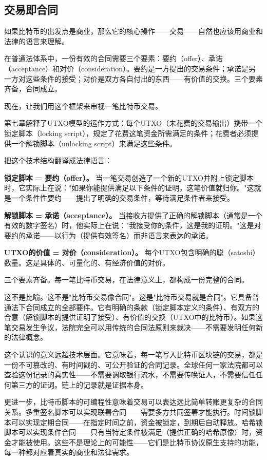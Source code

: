 \documentclass[a4paper,12pt,openany]{ctexbook}
\begin{document}
\subsection*{交易即合同}


如果比特币的出发点是商业，那么它的核心操作——交易——自然也应该用商业和法律的语言来理解。

在普通法体系中，一份有效的合同需要三个要素：要约（offer）、承诺（acceptance）和对价（consideration）。要约是一方提出的交易条件；承诺是另一方对这些条件的接受；对价是双方各自付出的东西——有价值的交换。三个要素齐备，合同成立。

现在，让我们用这个框架来审视一笔比特币交易。

第七章解释了UTXO模型的运作方式：每个UTXO（未花费的交易输出）携带一个锁定脚本（locking script），规定了花费这笔资金所需满足的条件；花费者必须提供一个解锁脚本（unlocking script）来满足这些条件。

把这个技术结构翻译成法律语言：

\textbf{锁定脚本 = 要约（offer）。} 当一笔交易创造了一个新的UTXO并附上锁定脚本时，它实际上在说："如果你能提供满足以下条件的证明，这笔价值就归你。"这就是一个条件性要约——提出了明确的交易条件，等待满足条件者来接受。

\textbf{解锁脚本 = 承诺（acceptance）。} 当接收方提供了正确的解锁脚本（通常是一个有效的数字签名）时，他实际上在说："我接受你的条件，这是我的证明。"这是对要约的承诺——以行为（提供有效签名）而非语言来表达的承诺。

\textbf{UTXO的价值 = 对价（consideration）。} 每个UTXO包含明确的聪（satoshi）数量。这是具体的、可量化的、有经济价值的对价。

三个要素齐备。每一笔比特币交易，在法律意义上，都构成一份完整的合同。

这不是比喻。这不是"比特币交易像合同"。这是"比特币交易就是合同"。它具备普通法下合同成立的全部要件。它有明确的条款（锁定脚本定义的条件）、有双方的合意（解锁脚本的提供证明了接受）、有价值的交换（UTXO中的比特币）。如果这笔交易发生争议，法院完全可以用传统的合同法原则来裁决——不需要发明任何新的法律概念。

这个认识的意义远超技术层面。它意味着，每一笔写入比特币区块链的交易，都是一份不可篡改的、有时间戳的、可公开验证的合同记录。全球任何一家法院都可以查验这份记录的真实性——不需要调取银行流水，不需要传唤证人，不需要信任任何第三方的证词。链上的记录就是证据本身。

更进一步，比特币脚本的可编程性意味着交易可以表达远比简单转账更复杂的合同关系。多重签名脚本可以实现联署合同——需要多方共同签署才能执行。时间锁脚本可以实现定期合同——在指定时间之前，资金被锁定，到期后自动释放。哈希锁脚本可以实现条件合同——只有当特定条件被满足（提供正确的哈希原像）时，资金才能被使用。这些不是理论上的可能性——它们是比特币协议原生支持的功能，每一种都对应着真实的商业和法律需求。
\end{document}
